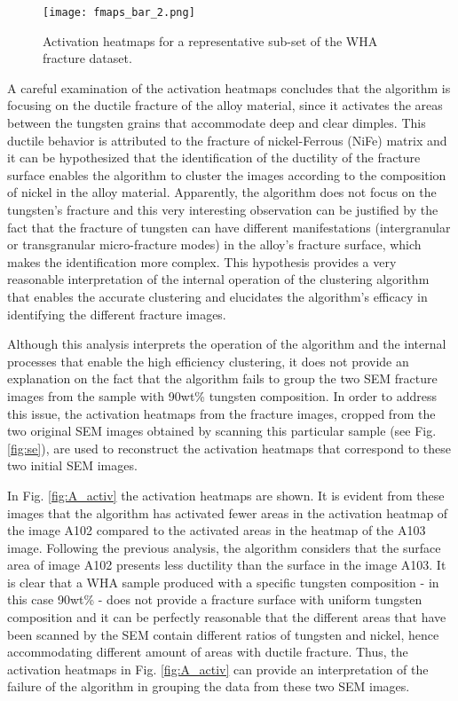 \documentclass[authoryear,preprint,review,12pt, singleside]{elsarticle}
\begin{document}
\begin{figure}[H]
	\centering
	\texttt{[image: fmaps\_bar\_2.png]}
	\caption{Activation heatmaps for a representative sub-set of the WHA fracture dataset.}
	\label{fig:activ_maps}
\end{figure} 


A careful examination of the activation heatmaps concludes that the algorithm is focusing on the ductile fracture of the alloy material, since it activates the areas between the tungsten grains that accommodate deep and clear dimples. This ductile behavior is  attributed to the fracture of nickel-Ferrous (NiFe) matrix and it can be hypothesized that the identification of the ductility of the fracture surface enables the algorithm to cluster the images according to the composition of nickel in the alloy material. Apparently, the algorithm does not focus on the tungsten's fracture and this very interesting observation can be justified by the fact that the fracture of tungsten can have different manifestations (intergranular or transgranular micro-fracture modes) in the alloy's fracture surface, which makes the identification more complex. This hypothesis provides a very reasonable interpretation of the internal operation of the clustering algorithm that enables the accurate clustering and elucidates the algorithm's efficacy in identifying the different fracture images. 

Although this analysis interprets the operation of the algorithm and the internal processes that enable the high efficiency clustering, it does not provide an explanation on the fact that the algorithm fails to group the two SEM fracture images from the sample with 90wt\% tungsten composition. In order to address this issue, the activation heatmaps from the fracture images, cropped from the two original SEM images obtained by scanning this particular sample (see Fig. \ref{fig:se}), are used to reconstruct the activation heatmaps that correspond to these two initial SEM images. 

In Fig. \ref{fig:A_activ} the activation heatmaps are shown. It is evident from these images that the algorithm has activated fewer areas in the activation heatmap of the image A102 compared to the activated areas in the heatmap of the A103 image. Following the previous analysis, the algorithm considers that the surface area of image A102 presents less ductility than the surface in the image A103. It is clear that a WHA sample produced with a specific tungsten composition - in this case 90wt\% - does not provide a fracture surface with uniform tungsten composition and it can be perfectly reasonable that the different areas that have been scanned by the SEM contain different ratios of tungsten and nickel, hence accommodating different amount of areas with ductile fracture. Thus, the activation heatmaps in Fig. \ref{fig:A_activ} can provide an interpretation of the failure of the algorithm in grouping the data from these two SEM images.   
\end{document}
